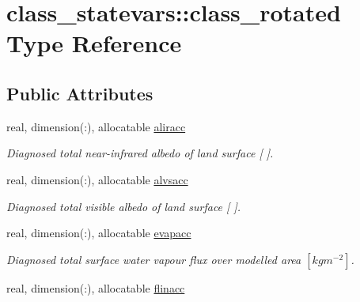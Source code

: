 \hypertarget{structclass__statevars_1_1class__rotated}{}\section{class\+\_\+statevars\+:\+:class\+\_\+rotated Type Reference}
\label{structclass__statevars_1_1class__rotated}
\subsection*{Public Attributes}
\begin{DoxyCompactItemize}
\item 
\hypertarget{structclass__statevars_1_1class__rotated_aff7084092cd45a13e9580c2f2aa2e247}{}real, dimension(\+:), allocatable \hyperlink{structclass__statevars_1_1class__rotated_aff7084092cd45a13e9580c2f2aa2e247}{aliracc}\label{structclass__statevars_1_1class__rotated_aff7084092cd45a13e9580c2f2aa2e247}

\begin{DoxyCompactList}\small\item\em Diagnosed total near-\/infrared albedo of land surface \mbox{[} \mbox{]}. \end{DoxyCompactList}\item 
\hypertarget{structclass__statevars_1_1class__rotated_a02c201e4d35760ce8eef9d2df5530d33}{}real, dimension(\+:), allocatable \hyperlink{structclass__statevars_1_1class__rotated_a02c201e4d35760ce8eef9d2df5530d33}{alvsacc}\label{structclass__statevars_1_1class__rotated_a02c201e4d35760ce8eef9d2df5530d33}

\begin{DoxyCompactList}\small\item\em Diagnosed total visible albedo of land surface \mbox{[} \mbox{]}. \end{DoxyCompactList}\item 
\hypertarget{structclass__statevars_1_1class__rotated_a6217e87164b8a1a00c6df4231fbc3eec}{}real, dimension(\+:), allocatable \hyperlink{structclass__statevars_1_1class__rotated_a6217e87164b8a1a00c6df4231fbc3eec}{evapacc}\label{structclass__statevars_1_1class__rotated_a6217e87164b8a1a00c6df4231fbc3eec}

\begin{DoxyCompactList}\small\item\em Diagnosed total surface water vapour flux over modelled area $[kg m^{-2} ]$. \end{DoxyCompactList}\item 
\hypertarget{structclass__statevars_1_1class__rotated_a522cbb8111cc6b67a684a4fba28a5204}{}real, dimension(\+:), allocatable \hyperlink{structclass__statevars_1_1class__rotated_a522cbb8111cc6b67a684a4fba28a5204}{flinacc}\label{structclass__statevars_1_1class__rotated_a522cbb8111cc6b67a684a4fba28a5204}


\end{DoxyCompactItemize}
